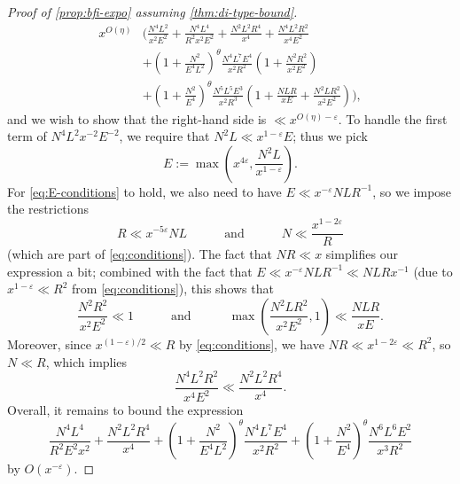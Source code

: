 \documentclass[reqno,11pt]{amsart}
\theoremstyle{definition}
\theoremstyle{remark}
\numberwithin{equation}{section}
\newcommand{\eps}{\varepsilon}
\begin{document}
\begin{proof}[Proof of \cref{prop:bfi-expo} assuming \cref{thm:di-type-bound}]
\[\begin{aligned}
    x^{O(\eta)} &\Bigg( \frac{N^4 L^2}{x^2 E^2} + \frac{N^4 L^4}{R^2 x^2 E^2} + \frac{N^2 L^2 R^4}{x^4} + \frac{N^4 L^2 R^2}{x^4 E^2}
    \\
    &+ \left(1 + \frac{N^2}{E^4 L^2}\right)^{\theta} \frac{N^4 L^7 E^4}{x^2 R^2} \left(1 + \frac{N^2 R^2}{x^2 E^2}\right)
    \\
    &+ \left(1 + \frac{N^2}{E^4} \right)^{\theta} \frac{N^5 L^5 E^3}{x^2 R^3} \left( 
    1 + \frac{NLR}{xE} + \frac{N^2 L R^2}{x^2 E^2}
    \right) \Bigg),
\end{aligned} %
\]
and we wish to show that the right-hand side is $\ll x^{O(\eta) - \eps}$. To handle the first term of $N^4 L^2 x^{-2} E^{-2}$, we require that $N^2 L \ll x^{1-\eps} E$; thus we pick
\begin{equation} \label{eq:E-choice}
    E := \max\left( x^{4\eps}, \frac{N^2 L}{x^{1-\eps}} \right).
\end{equation}
For \cref{eq:E-conditions} to hold, we also need to have $E \ll x^{-\eps} NL R^{-1}$, so we impose the restrictions
\[
    R \ll x^{-5\eps} NL \qquad\quad \text{and} \qquad\quad N \ll \frac{x^{1-2\eps}}{R}
\]
(which are part of \cref{eq:conditions}). The fact that $NR \ll x$ simplifies our expression a bit; combined with the fact that $E \ll x^{-\eps} N L R^{-1} \ll NL R x^{-1}$ (due to $x^{1-\eps} \ll R^2$ from \cref{eq:conditions}), this shows that
\[
    \frac{N^2 R^2}{x^2 E^2} \ll 1 \qquad\quad \text{and} \qquad\quad
    \max\left(\frac{N^2 L R^2}{x^2 E^2}, 1\right) \ll \frac{N L R}{x E}.
\]
Moreover, since $x^{(1-\eps)/2} \ll R$ by \cref{eq:conditions}, we have $NR \ll x^{1-2\eps} \ll R^2$, so $N \ll R$, which implies
\[
    \frac{N^4 L^2 R^2}{x^4 E^2} \ll \frac{N^2 L^2 R^4}{x^4}.
\]
Overall, it remains to bound the expression
\begin{equation} \label{eq:final-to-bound}
    \frac{N^4 L^4}{R^2 E^2 x^2} + \frac{N^2 L^2 R^4}{x^4}
    + \left(1 + \frac{N^2}{E^4 L^2}\right)^{\theta} \frac{N^4 L^7 E^4}{x^2 R^2}
    + \left(1 + \frac{N^2}{E^4}\right)^{\theta} \frac{N^6 L^6 E^2}{x^3 R^2}
\end{equation}
by $O(x^{-\eps})$.


\end{proof}
\end{document}
